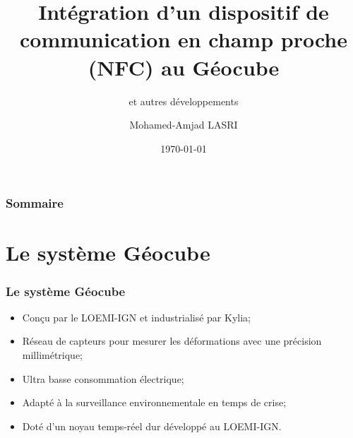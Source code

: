\documentclass{beamer}
\title[Stage de Fin d'Études]{Intégration d'un dispositif de communication en champ proche (NFC) au Géocube} %
\subtitle{et autres développements}
\author{Mohamed-Amjad LASRI} %
\institute[IT3 - GTSI] %
{
KYLIA et LOEMI-IGN\\
École Nationale des Sciences Géographiques \\ %
\medskip
\textit{mohamed-amjad.lasri@ensg.eu} %
}
\date{\today} %
\begin{document}
\begin{frame}
\titlepage %
\end{frame}

\begin{frame}
\frametitle{Sommaire} %
\tableofcontents[
currentsection,
  sectionstyle=show,
  subsectionstyle=hide
] %
\end{frame}


\section{Le système Géocube} %
\begin{frame}
\frametitle{Le système Géocube}
\begin{itemize}
\item Conçu par le LOEMI-IGN et industrialisé par Kylia;
\item Réseau de capteurs pour mesurer les déformations avec une précision millimétrique;
\item Ultra basse consommation électrique;
\item Adapté à la surveillance environnementale en temps de crise;
\item Doté d'un noyau temps-réel dur développé au LOEMI-IGN.
\end{itemize}
\end{frame}

\end{document}
